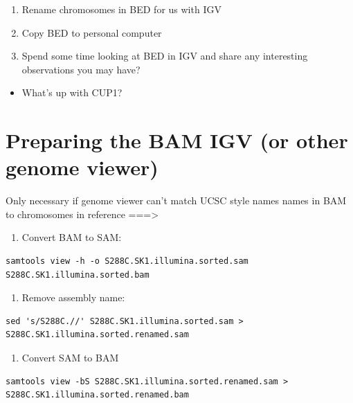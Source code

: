 \documentclass[
]{book}
\providecommand{\tightlist}{%
  \setlength{\itemsep}{0pt}\setlength{\parskip}{0pt}}
\begin{document}
\begin{enumerate}
\def\labelenumi{\arabic{enumi}.}
\tightlist
\item
  Rename chromosomes in BED for us with IGV
\item
  Copy BED to personal computer
\item
  Spend some time looking at BED in IGV and share any interesting observations
  you may have?
\end{enumerate}

\begin{itemize}
\tightlist
\item
  What's up with CUP1?
\end{itemize}

\hypertarget{preparing-the-bam-igv-or-other-genome-viewer}{%
\section{Preparing the BAM IGV (or other genome viewer)}\label{preparing-the-bam-igv-or-other-genome-viewer}}

Only necessary if genome viewer can't match UCSC style names names in BAM to chromosomes in reference
===\textgreater{}

\begin{enumerate}
\def\labelenumi{\arabic{enumi}.}
\tightlist
\item
  Convert BAM to SAM:
\end{enumerate}

\begin{verbatim}
samtools view -h -o S288C.SK1.illumina.sorted.sam S288C.SK1.illumina.sorted.bam
\end{verbatim}

\begin{enumerate}
\def\labelenumi{\arabic{enumi}.}
\setcounter{enumi}{1}
\tightlist
\item
  Remove assembly name:
\end{enumerate}

\begin{verbatim}
sed 's/S288C.//' S288C.SK1.illumina.sorted.sam > S288C.SK1.illumina.sorted.renamed.sam
\end{verbatim}

\begin{enumerate}
\def\labelenumi{\arabic{enumi}.}
\setcounter{enumi}{2}
\tightlist
\item
  Convert SAM to BAM
\end{enumerate}

\begin{verbatim}
samtools view -bS S288C.SK1.illumina.sorted.renamed.sam > S288C.SK1.illumina.sorted.renamed.bam
\end{verbatim}
\end{document}
